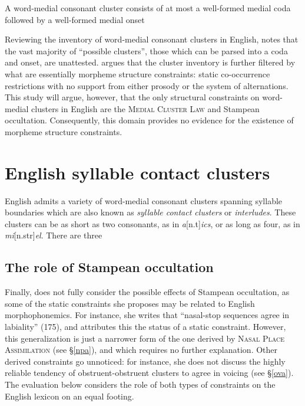 \begin{example}
\label{mcl}
A word-medial consonant cluster consists of at most a well-formed medial coda followed by a well-formed medial onset
\end{example}

Reviewing the inventory of word-medial consonant clusters in English, 
\citet{Pierrehumbert1994} notes that the vast majority of ``possible clusters'', those which can be parsed into a coda and onset, are unattested. \citeauthor{Pierrehumbert1994} argues that the cluster inventory is further filtered by what are essentially morpheme structure constraints: static co-occurrence restrictions with no support from either prosody or the system of alternations. This study will argue, however, that the only structural constraints on word-medial clusters in English are the \textsc{Medial Cluster Law} and Stampean occultation. Consequently, this domain provides no evidence for the existence of morpheme structure constraints.

\section{English syllable contact clusters \citep{Pierrehumbert1994}}

English admits a variety of word-medial consonant clusters spanning syllable boundaries which are also known as \emph{syllable contact clusters} or \emph{interludes}. These clusters can be as short as two consonants, as in \emph{a}[n.t]\emph{ics}, or as long as four, as in \emph{mi}[n.str]\emph{el}. 
There are three 

\subsection{The role of Stampean occultation}

Finally, \citeauthor{Pierrehumbert1994} does not fully consider the possible effects of Stampean occultation, as some of the static constraints she proposes may be related to English morphophonemics. For instance, she writes that ``nasal-stop sequences agree in labiality'' (175), and attributes this the status of a static constraint. However, this generalization is just a narrower form of the one derived by \textsc{Nasal Place Assimilation} (see \S\ref{npa}), and which requires no further explanation. Other derived constraints go unnoticed: for instance, she does not discuss the highly reliable tendency of obstruent-obstruent clusters to agree in voicing (see \S\ref{ova}). The evaluation below considers the role of both types of constraints on the English lexicon on an equal footing.

